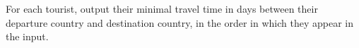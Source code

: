 
	For each tourist, output their minimal travel time in days between their
	departure country and destination country, in the order in which they appear in the input.
